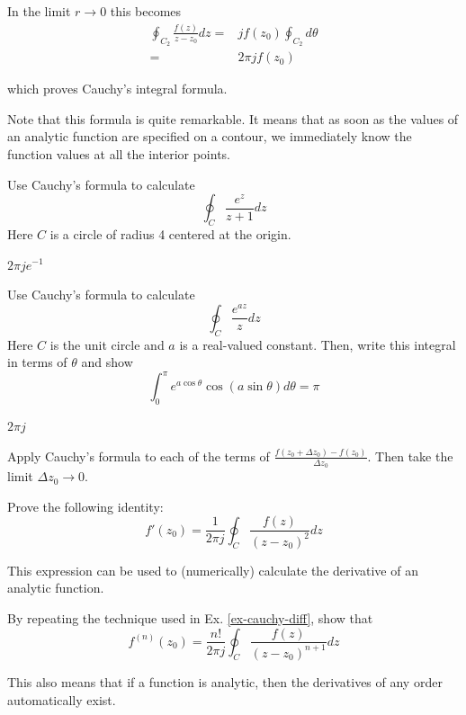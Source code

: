 In the limit $ r \to 0 $ this becomes
\begin{align}
\oint_{{C}_2} \frac{f(z)} {z-z_0} dz = & j f(z_0) \oint_{{C}_2}
d \theta \nonumber \\
 = &2 \pi j f(z_0)
\end{align}
 
which proves Cauchy's integral formula.

Note that this formula is quite remarkable. It means that as soon as the values of an analytic function are specified on a contour, we immediately know the function values at all the interior points.

\begin{exer}
Use Cauchy's formula to calculate 
$$\oint_{{C}}  \frac {e^z} {z+1} dz$$
Here ${C}$ is a circle of radius 4 centered at the origin.
\begin{sol}
  $2 \pi j e^{-1}$
\end{sol}
\end{exer}

\begin{exer}
Use Cauchy's formula to calculate 
$$\oint_{{C}}  \frac {e^{az}} {z} dz$$
Here ${C}$ is the unit circle and $a$ is a real-valued constant. Then, write this integral in terms of $\theta$ and show
$$ \int_0^\pi e ^{a \cos \theta} \cos (a \sin \theta) d\theta = \pi $$

\begin{sol}
  $2 \pi j$
\end{sol}
\end{exer}

\begin{exer}
\begin{hnt}
Apply Cauchy's formula to each of the terms of $\frac{f(z_0+\Delta z_0) - f(z_0)}{\Delta z_0}$. Then take the limit ${\Delta z_0} \to 0$.
\end{hnt}
Prove the following identity:
$$f'(z_0)=\frac{1}{2 \pi j} \oint_{{C}} \frac{f(z)} {(z-z_0)^2} dz$$

This expression can be used to (numerically) calculate the derivative of an analytic function.
\label{ex-cauchy-diff}
\end{exer}

\begin{exer}
By repeating the technique used in Ex. \ref{ex-cauchy-diff}, show that $$f^{(n)}(z_0)=\frac{n!}{2 \pi j} \oint_{{C}} \frac{f(z)} {(z-z_0)^{n+1}} dz$$

This also means that if a function is analytic, then the derivatives of any order automatically exist.
\end{exer}

